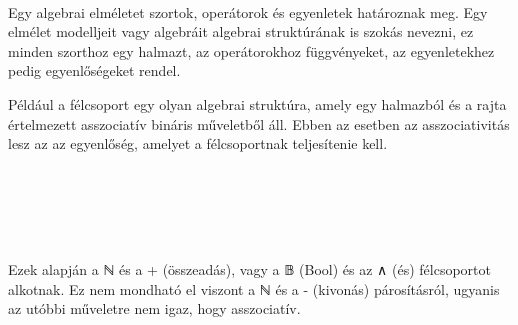 \begin{code}[hide]%
\>[0]\AgdaSpace{}%
\AgdaSpace{}%
\<%
\\
\>[0]\AgdaSpace{}%
\AgdaSpace{}%
\<%
\end{code}

Egy algebrai elméletet szortok, operátorok és egyenletek határoznak meg. Egy elmélet modelljeit vagy algebráit algebrai struktúrának is szokás nevezni, ez minden szorthoz egy halmazt, az operátorokhoz függvényeket, az egyenletekhez pedig egyenlőségeket rendel.

Például a félcsoport egy olyan algebrai struktúra, amely egy halmazból és a rajta értelmezett asszociatív bináris műveletből áll. Ebben az esetben az asszociativitás lesz az az egyenlőség, amelyet a félcsoportnak teljesítenie kell.

\begin{code}%
\>[0]\AgdaSpace{}%
\AgdaSpace{}%
\AgdaSymbol{:}\AgdaSpace{}%
\AgdaSpace{}%
\<%
\\
\>[0][@{}l@{\AgdaIndent{0}}]%
\>[2]\<%
\\
\>[2][@{}l@{\AgdaIndent{0}}]%
\>[4]\AgdaSpace{}%
\AgdaSymbol{:}\AgdaSpace{}%
\<%
\\
%
\>[4]\AgdaSpace{}%
\AgdaSymbol{:}\AgdaSpace{}%
\AgdaSpace{}%
\AgdaSpace{}%
\AgdaSpace{}%
\AgdaSpace{}%
\<%
\\
%
\>[4]\AgdaSpace{}%
\AgdaSymbol{:}\AgdaSpace{}%
\AgdaSymbol{(}\AgdaSpace{}%
\AgdaSpace{}%
\AgdaSpace{}%
\AgdaSymbol{:}\AgdaSpace{}%
\AgdaSymbol{)}\AgdaSpace{}%
\AgdaSpace{}%
\AgdaSymbol{(}\AgdaSpace{}%
\AgdaSpace{}%
\AgdaSymbol{)}\AgdaSpace{}%
\AgdaSpace{}%
\AgdaSpace{}%
\AgdaSpace{}%
\AgdaSpace{}%
\AgdaSpace{}%
\AgdaSymbol{(}\AgdaSpace{}%
\AgdaSpace{}%
\AgdaSymbol{)}\<%
\end{code}

Ezek alapján a ℕ és a + (összeadás), vagy a 𝔹 (Bool) és az ∧ (és) félcsoportot alkotnak. Ez nem mondható el viszont a ℕ és a - (kivonás) párosításról, ugyanis az utóbbi műveletre nem igaz, hogy asszociatív.

